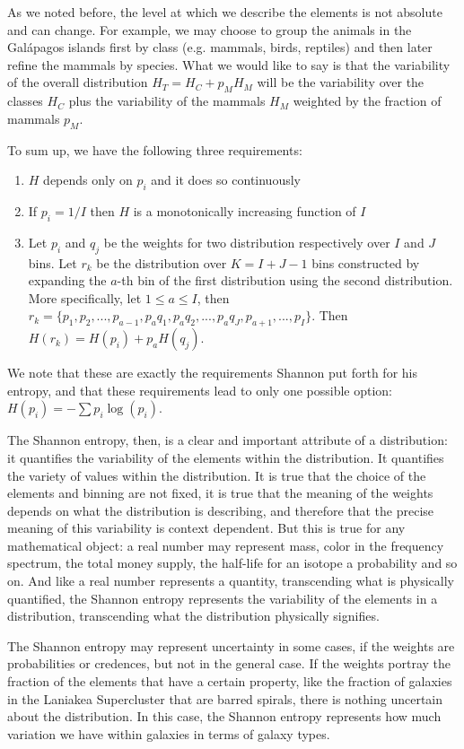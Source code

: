 \documentclass{article}
\begin{document}
As we noted before, the level at which we describe the elements is not absolute and can change. For example, we may choose to group the animals in the Gal\'{a}pagos islands first by class (e.g. mammals, birds, reptiles) and then later refine the mammals by species. What we would like to say is that the variability of the overall distribution $H_T = H_C + p_M H_M$ will be the variability over the classes $H_C$ plus the variability of the mammals $H_M$ weighted by the fraction of mammals $p_M$.

To sum up, we have the following three requirements:
\begin{enumerate}
    \item $H$ depends only on $p_i$ and it does so continuously
    \item If $p_i=1/I$ then $H$ is a monotonically increasing function of $I$
    \item Let $p_i$ and $q_j$ be the weights for two distribution respectively over $I$ and $J$ bins. Let $r_k$ be the distribution over $K=I+J-1$ bins constructed by expanding the $a$-th bin of the first distribution using the second distribution. More specifically, let $1 \leq a \leq I$, then $r_k = \{p_1, p_2, ..., p_{a-1}, p_{a}q_1, p_{a}q_2, ..., p_{a}q_J, p_{a+1}, ..., p_I \}$. Then $H(r_k) = H(p_i) + p_{a} H(q_j)$.
\end{enumerate}

We note that these are exactly the requirements Shannon put forth for his entropy\cite{Shannon}, and that these requirements lead to only one possible option: $H(p_i) = - \sum p_i \log(p_i)$.

The Shannon entropy, then, is a clear and important attribute of a distribution: it quantifies the variability of the elements within the distribution. It quantifies the variety of values within the distribution. It is true that the choice of the elements and binning are not fixed, it is true that the meaning of the weights depends on what the distribution is describing, and therefore that the precise meaning of this variability is context dependent. But this is true for any mathematical object: a real number may represent mass, color in the frequency spectrum, the total money supply, the half-life for an isotope a probability and so on. And like a real number represents a quantity, transcending what is physically quantified, the Shannon entropy represents the variability of the elements in a distribution, transcending what the distribution physically signifies.

The Shannon entropy may represent uncertainty in some cases, if the weights are probabilities or credences, but not in the general case. If the weights portray the fraction of the elements that have a certain property, like the fraction of galaxies in the Laniakea Supercluster that are barred spirals, there is nothing uncertain about the distribution. In this case, the Shannon entropy represents how much variation we have within galaxies in terms of galaxy types.
\end{document}
